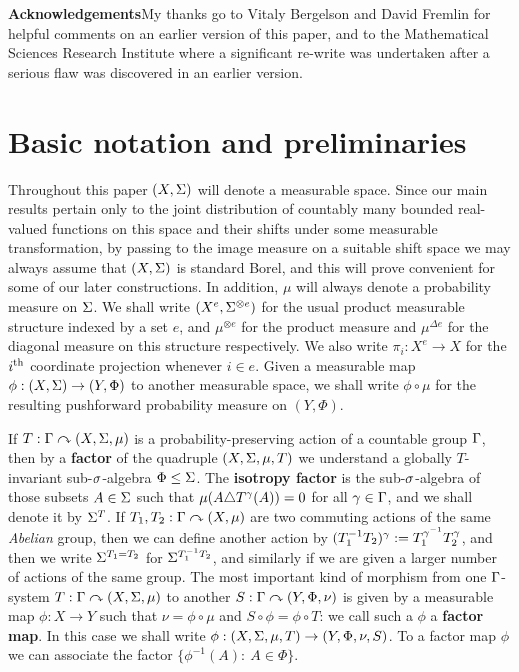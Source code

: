 \documentclass[12pt]{article}
\begin{document}
\textbf{Acknowledgements}\quad My thanks go to Vitaly Bergelson and
David Fremlin for helpful comments on an earlier version of this
paper, and to the Mathematical Sciences Research Institute where a
significant re-write was undertaken after a serious flaw was
discovered in an earlier version.

\section{Basic notation and preliminaries}\label{sec:prelim}

Throughout this paper $(X,\S)$ will denote a measurable space.
Since our main results pertain only to the joint distribution of
countably many bounded real-valued functions on this space and their
shifts under some measurable transformation, by passing to the image
measure on a suitable shift space we may always assume that $(X,\S)$
is standard Borel, and this will prove convenient for some of our
later constructions. In addition, $\mu$ will always denote a
probability measure on $\S$. We shall write $(X^e,\S^{\otimes e})$
for the usual product measurable structure indexed by a set $e$, and
$\mu^{\otimes e}$ for the product measure and $\mu^{\Delta e}$ for
the diagonal measure on this structure respectively.  We also write
$\pi_i:X^e \to X$ for the $i^{\rm{th}}$ coordinate projection
whenever $i \in e$. Given a measurable map $\phi:(X,\S)\to (Y,\Phi)$
to another measurable space, we shall write $\phi\circ\mu$ for the
resulting pushforward probability measure on $(Y,\Phi)$.

If $T:\G\curvearrowright (X,\S,\mu)$ is a probability-preserving
action of a countable group $\G$, then by a \textbf{factor} of the
quadruple $(X,\S,\mu,T)$ we understand a globally $T$-invariant
sub-$\s$-algebra $\Phi \leq \S$. The \textbf{isotropy factor} is the
sub-$\s$-algebra of those subsets $A \in \S$ such that
$\mu(A\triangle T^\g(A)) = 0$ for all $\g\in \G$, and we shall
denote it by $\S^T$.  If $T_1,T_2:\G\curvearrowright (X,\mu)$ are
two commuting actions of the same \emph{Abelian} group, then we can
define another action by $(T_1^{-1}T_2)^\g := T^{\g^{-1}}_1T_2^\g$,
and then we write $\S^{T_1 = T_2}$ for $\S^{T_1^{-1}T_2}$, and
similarly if we are given a larger number of actions of the same
group. The most important kind of morphism from one $\G$-system
$T:\G\curvearrowright (X,\S,\mu)$ to another $S:\G\curvearrowright
(Y,\Phi,\nu)$ is given by a measurable map $\phi:X \to Y$ such that
$\nu = \phi\circ\mu$ and $S\circ\phi = \phi\circ T$: we call such a
$\phi$ a \textbf{factor map}.  In this case we shall write
$\phi:(X,\S,\mu,T) \to (Y,\Phi,\nu,S)$.  To a factor map $\phi$ we
can associate the factor $\{\phi^{-1}(A):\ A\in\Phi\}$.
\end{document}

